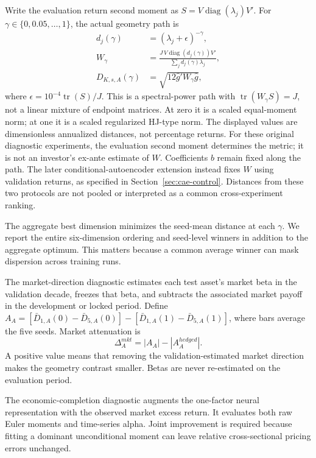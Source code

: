 Write the evaluation return second moment as $S=V\operatorname{diag}(\lambda_j)V'$. For $\gamma\in\{0,0.05,\ldots,1\}$, the actual geometry path is
\begin{align}
 d_j(\gamma)&=(\lambda_j+\epsilon)^{-\gamma},\\
 W_\gamma&=\frac{J\,V\operatorname{diag}(d_j(\gamma))V'}{\sum_jd_j(\gamma)\lambda_j},\\
 D_{K,s,A}(\gamma)&=\sqrt{12\hat g'W_\gamma\hat g},
\end{align}
where $\epsilon=10^{-4}\operatorname{tr}(S)/J$. This is a spectral-power path with $\operatorname{tr}(W_\gamma S)=J$, not a linear mixture of endpoint matrices. At zero it is a scaled equal-moment norm; at one it is a scaled regularized HJ-type norm. The displayed values are dimensionless annualized distances, not percentage returns. For these original diagnostic experiments, the evaluation second moment determines the metric; it is not an investor's ex-ante estimate of $W$. Coefficients $b$ remain fixed along the path. The later conditional-autoencoder extension instead fixes $W$ using validation returns, as specified in Section~\ref{sec:cae-control}. Distances from these two protocols are not pooled or interpreted as a common cross-experiment ranking.

The aggregate best dimension minimizes the seed-mean distance at each $\gamma$. We report the entire six-dimension ordering and seed-level winners in addition to the aggregate optimum. This matters because a common average winner can mask dispersion across training runs.

The market-direction diagnostic estimates each test asset's market beta in the validation decade, freezes that beta, and subtracts the associated market payoff in the development or locked period. Define $A_A=[\bar D_{1,A}(0)-\bar D_{5,A}(0)]-[\bar D_{1,A}(1)-\bar D_{5,A}(1)]$, where bars average the five seeds. Market attenuation is
\begin{equation}
 \Delta_A^{mkt}=|A_A|-|A_A^{hedged}|.
\end{equation}
A positive value means that removing the validation-estimated market direction makes the geometry contrast smaller. Betas are never re-estimated on the evaluation period.

The economic-completion diagnostic augments the one-factor neural representation with the observed market excess return. It evaluates both raw Euler moments and time-series alpha. Joint improvement is required because fitting a dominant unconditional moment can leave relative cross-sectional pricing errors unchanged.

